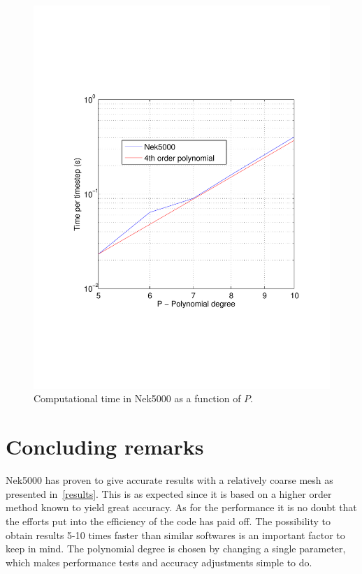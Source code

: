 \begin{figure}[h]
{\begin{minipage}{.6\textwidth}
  \includegraphics[trim=0.5cm 3cm 0.5cm 7cm,width=1.0\linewidth]{Figures/tperstep.pdf}
\end{minipage}
}
  \caption{Computational time in Nek5000 as a function of $P$. }
  \label{fig:surfpro}
\end{figure}
%
\chapter{Concluding remarks} \label{discussion}
Nek5000 has proven to give accurate results with a relatively coarse mesh as
presented in~\cref{results}. This is as expected since it is based on a higher order 
method known to yield great accuracy. As for the performance it is no doubt that the 
efforts put into the efficiency of the code has paid off. The possibility to obtain 
results 5-10 times faster than similar softwares is an important factor to keep in mind. 
The polynomial degree is chosen by changing a single parameter, which makes performance tests
and accuracy adjustments simple to do. 

